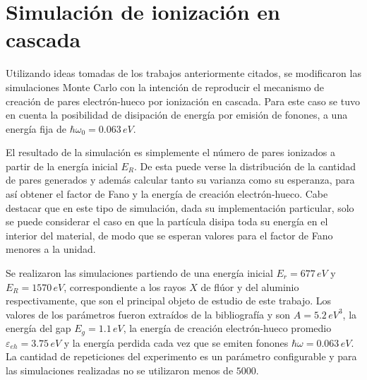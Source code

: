 \section{Simulación de ionización en cascada}
\noindent Utilizando ideas tomadas de los trabajos anteriormente citados, se modificaron las simulaciones Monte Carlo con la intención de reproducir el mecanismo de creación de pares electrón-hueco por ionización en cascada. Para este caso se tuvo en cuenta la posibilidad de disipación de energía por emisión de fonones, a una energía fija de $\hbar\omega_{0} = 0.063\,eV$.

El resultado de la simulación es simplemente el número de pares 
ionizados a partir de la energía inicial $E_{R}$. De esta puede verse la distribución de la cantidad de pares generados y además calcular tanto su varianza como su esperanza, para así obtener el factor de Fano y la energía de creación electrón-hueco.
Cabe destacar que en este tipo de simulación, dada su implementación particular, solo se puede considerar el caso en que la partícula disipa toda su energía en el interior del material, de modo que se esperan valores para el factor de Fano menores a la unidad.

Se realizaron las simulaciones partiendo de una energía inicial $E_{r} = 677\,\si{eV}$ y $E_{R} = 1570\,\si{eV}$, correspondiente a los rayos $X$ de flúor y del aluminio respectivamente, que son el principal objeto de estudio de este trabajo. Los valores de los parámetros fueron extraídos de la bibliografía\cite{Alig, Ramanathan} y son $A = 5.2\,\si{eV}^{3}$, la energía del gap $E_{g} = 1.1\,\si{eV}$, la energía de creación electrón-hueco promedio $\varepsilon_{eh} = 3.75\,\si{eV}$ y la energía perdida cada vez que se emiten fonones $\hbar \omega = 0.063\,\si{eV}$. La cantidad de repeticiones del experimento es un parámetro configurable y para las simulaciones realizadas no se utilizaron menos de $5000$. %

